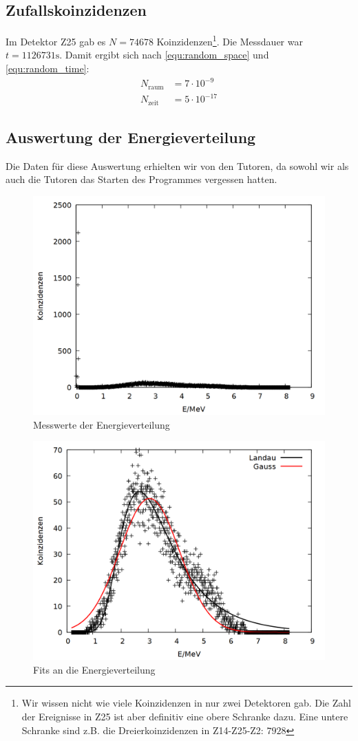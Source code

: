 \subsection{Zufallskoinzidenzen}
Im Detektor Z25 gab es $N = 74678$ Koinzidenzen\footnote{Wir wissen nicht wie viele Koinzidenzen in nur zwei Detektoren gab. Die Zahl der Ereignisse in Z25 ist aber definitiv eine obere Schranke dazu. Eine untere Schranke sind z.B. die Dreierkoinzidenzen in Z14-Z25-Z2: $7928$}. Die Messdauer war $t = 1126731 \si{\second}$. Damit ergibt sich nach \ref{equ:random_space} und \ref{equ:random_time}:\\
\begin{align*}
N_{\text{raum}} &= 7 \cdot 10^{-9}\\
N_{\text{zeit}} &= 5 \cdot 10^{-17}
\end{align*}  
 
\subsection{Auswertung der Energieverteilung}

Die Daten für diese Auswertung erhielten wir von den Tutoren, da sowohl wir als auch die Tutoren das Starten des Programmes vergessen hatten.\\

\begin{figure}
\centering
\includegraphics[width=0.75\linewidth]{data/friedrich/mca_raw.png}
\caption{Messwerte der Energieverteilung}
\label{fig:mca_raw}
\end{figure}

\begin{figure}
\centering
\includegraphics[width=0.75\linewidth]{data/friedrich/mca.png}
\caption{Fits an die Energieverteilung}
\label{fig:mca}
\end{figure}

